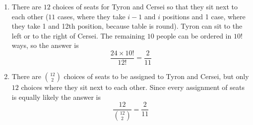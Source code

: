 \begin{enumerate}[label=(\alph*)]
\item  There are $12$ choices of seats for Tyron and Cersei so that they sit 
next to each other ($11$ cases, where they take $i-1$ and $i$ positions and 
1 case, where they take 1 and 12th position, because table is round). 
Tyron can sit to the left or to the right of Cersei.  
The remaining $10$ people can be ordered in $10!$ ways, so the answer is
$$\frac{24\times10!}{12!} = \frac{2}{11}$$

\item There are $\binom{12}{2}$ choices of seats to be assigned to Tyron and 
Cersei, but only $12$ choices where they sit next to each other. 
Since every assignment of seats is equally likely the answer is
$$\frac{12}{\binom{12}{2}} = \frac{2}{11}$$

\end{enumerate}

